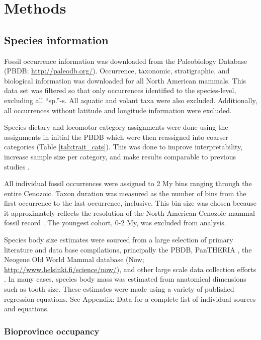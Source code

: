 \documentclass[12pt,letterpaper]{article}
\begin{document}
\section{Methods}

\subsection{Species information}

Fossil occurrence information was downloaded from the Paleobiology Database (PBDB; \url{http://paleodb.org/}). Occurrence, taxonomic, stratigraphic, and biological information was downloaded for all North American mammals. This data set was filtered so that only occurrences identified to the species-level, excluding all ``sp.''-s. All aquatic and volant taxa were also excluded. Additionally, all occurrences without latitude and longitude information were excluded.

Species dietary and locomotor category assignments were done using the assignments in initial the PBDB which were then reassigned into coarser categories (Table \ref{tab:trait_cats}). This was done to improve interpretability, increase sample size per category, and make results comparable to previous studies \citep{Jernvall2004,Price2012}.

All individual fossil occurrences were assigned to 2 My bins ranging through the entire Cenozoic. Taxon duration was measured as the number of bins from the first occurrence to the last occurrence, inclusive. This bin size was chosen because it approximately reflects the resolution of the North American Cenozoic mammal fossil record \citep{Alroy2009,Marcot2014,Alroy2000g}. The youngest cohort, 0-2 My, was excluded from analysis.

Species body size estimates were sourced from a large selection of primary literature and data base compilations, principally the PBDB, PanTHERIA \citep{Jones2009c}, the Neogene Old World Mammal database (Now; \url{http://www.helsinki.fi/science/now/}), and other large scale data collection efforts \citep{Smith2004c, Raia2012f, Brook2004a, Freudenthal2013, McKenna2011}. In many cases, species body mass was estimated from anatomical dimensions such as tooth size. These estimates were made using a variety of published regression equations. See Appendix: Data for a complete list of individual sources and equations. %


\subsubsection{Bioprovince occupancy}
\end{document}
